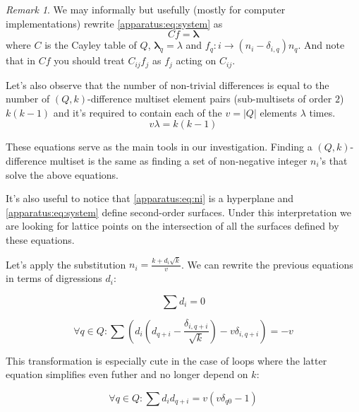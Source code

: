 \documentclass{article}
\theoremstyle{plain}
\theoremstyle{definition}
\theoremstyle{remark}
\newtheorem{remark}[theorem]{Remark}
\begin{document}
		\begin{remark}
            We may informally but usefully (mostly for computer implementations) rewrite \eqref{apparatus:eq:system} as 
            \begin{equation}
                \label{apparatus:eq:matrixform}
                Cf=\boldsymbol{\lambda}
            \end{equation}
            where $C$ is the Cayley table of $Q$, $\boldsymbol{\lambda}_q = \lambda$ and $f_q: i \rightarrow (n_i - \delta_{i,q})n_q$. And note that in $Cf$ you should treat $C_{ij}f_j$ as $f_j$ acting on $C_{ij}$.
		\end{remark}
		
		Let's also observe that the number of non-trivial differences is equal to the number of $(Q,k)$-difference multiset element pairs (sub-multisets of order $2$) $k(k-1)$ and it's required to contain each of the $v=|Q|$ elements $\lambda$ times.
		\begin{equation}
			\label{apparatus:eq:parameters}
			v\lambda = k(k-1)
		\end{equation}
		
		These equations serve as the main tools in our investigation. Finding a $(Q,k)$-difference multiset is the same as finding a set of non-negative integer $n_i$'s that solve the above equations. 
		
		It's also useful to notice that \eqref{apparatus:eq:ni} is a hyperplane and \eqref{apparatus:eq:system} define second-order surfaces. Under this interpretation we are looking for lattice points on the intersection of all the surfaces defined by these equations.
		
		Let's apply the substitution $n_i=\frac{k+d_i \sqrt k}v$. We can rewrite the previous equations in terms of digressions $d_i$:
		
		\begin{equation}
			\label{apparatus:eq:di}
			\sum {d_i} = 0
		\end{equation}
		
		\begin{equation}
			\label{apparatus:eq:dsystem_general}
			\forall q \in Q \colon \sum (d_i (d_{q+i}-\frac{\delta_{i,q+i}}{\sqrt k})-v\delta_{i,q+i}) = -v
		\end{equation}
		
		This transformation is especially cute in the case of loops where the latter equation simplifies even futher and no longer depend on $k$:
		
		\begin{equation}
			\label{apparatus:eq:dsystem}
			\forall q \in Q \colon \sum d_i d_{q+i} = v (v \delta_{q0}-1)
		\end{equation}
		
\end{document}
